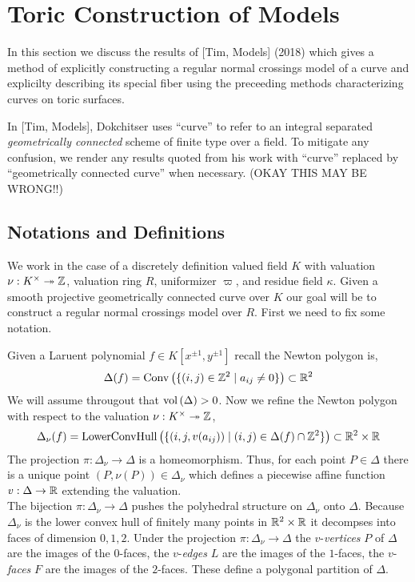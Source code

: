 \documentclass[12pt]{article}
\begin{document}
\section{Toric Construction of Models}

In this section we discuss the results of [Tim, Models] (2018) which gives a method of explicitly constructing a regular normal crossings model of a curve and explicilty describing its special fiber using the preceeding methods characterizing curves on toric surfaces. 
\begin{rmk}
In [Tim, Models], Dokchitser uses ``curve'' to refer to an integral separated \textit{geometrically connected} scheme of finite type over a field. To mitigate any confusion, we render any results quoted from his work with ``curve'' replaced by ``geometrically connected curve'' when necessary.
(OKAY THIS MAY BE WRONG!!)
\end{rmk}

\subsection{Notations and Definitions}

We work in the case of a discretely definition valued field $K$ with valuation $\nu : K^\times \twoheadrightarrow \mathbb{Z}$, valuation ring $R$, uniformizer $\varpi$, and residue field $\kappa$. Given a smooth projective geometrically connected curve over $K$ our goal will be to construct a regular normal crossings model over $R$. First we need to fix some notation.

\begin{defn}
Given a Laruent polynomial $f \in K[x^{\pm 1}, y^{\pm 1}]$ recall the Newton polygon is,
\[ \Delta(f) = \mathrm{Conv}\left(  \{ (i,j) \in \mathbb{Z}^2 \mid a_{ij} \neq 0 \}  \right) \subset \mathbb{R}^2 \]
We will assume througout that $\mathrm{vol}\left( \Delta \right) > 0$. 
Now we refine the Newton polygon with respect to the valuation $\nu : K^\times \twoheadrightarrow \mathbb{Z}$,
\[ \Delta_\nu(f) = \mathrm{LowerConvHull} \left( \{ (i, j, v(a_{ij})) \mid (i, j) \in \Delta(f) \cap \mathbb{Z}^2 \} \right) \subset \mathbb{R}^2 \times \mathbb{R} \]
The projection $\pi : \Delta_\nu \to \Delta$ is a homeomorphism. Thus,
for each point $P \in \Delta$ there is a unique point $(P, \nu(P)) \in \Delta_\nu$ which defines a piecewise affine function $v : \Delta \to \mathbb{R}$ extending the valuation. 
\bigskip\\
The bijection $\pi : \Delta_\nu \to \Delta$ pushes the polyhedral structure on $\Delta_\nu$ onto $\Delta$. Because $\Delta_\nu$ is the lower convex hull of finitely many points in $\mathbb{R}^2 \times \mathbb{R}$ it decompses into faces of dimension $0, 1, 2$. Under the projection $\pi : \Delta_\nu \to \Delta$ the $v$-\textit{vertices} $P$ of $\Delta$ are the images of the $0$-faces, the $v$-\textit{edges} $L$ are the images of the $1$-faces, the $v$-\textit{faces} $F$ are the images of the $2$-faces. These define a polygonal partition of $\Delta$. 
\end{defn}
\end{document}
